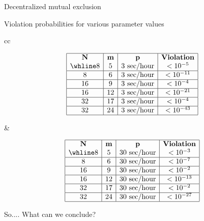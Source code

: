 \begin{slide}{Decentralized mutual exclusion}
  \begin{block}{Violation probabilities for various parameter values}
    \begin{center}
      \small\footnotesize
      \renewcommand{\arraystretch}{1.1}
      \begin{tabular}{cc}
        \begin{minipage}{0.4\textwidth}
          \[
          \begin{array}{|c|c|c|c|}\hline
            \mathbf{N}  & \mathbf{m} & \mathbf{p}        & \mbox{\textbf{Violation}} \\ \whline
            8           & 5          & \mbox{3 sec/hour} & < 10^{-5} \\ \hline
            8           & 6          & \mbox{3 sec/hour} & < 10^{-11} \\ \hline
            16          & 9          & \mbox{3 sec/hour} & < 10^{-4} \\ \hline
            16          & 12         & \mbox{3 sec/hour} & < 10^{-21} \\ \hline
            32          & 17         & \mbox{3 sec/hour} & < 10^{-4} \\ \hline
            32          & 24         & \mbox{3 sec/hour} & < 10^{-43} \\ \hline
          \end{array}
          \]
        \end{minipage} &
        \begin{minipage}{0.4\textwidth}
          \[
          \begin{array}{|c|c|c|c|}\hline
            \mathbf{N}  & \mathbf{m} & \mathbf{p}        & \mbox{\textbf{Violation}} \\ \whline
            8           & 5          & \mbox{30 sec/hour} & < 10^{-3} \\ \hline
            8           & 6          & \mbox{30 sec/hour} & < 10^{-7} \\ \hline
            16          & 9          & \mbox{30 sec/hour} & < 10^{-2} \\ \hline
            16          & 12         & \mbox{30 sec/hour} & < 10^{-13} \\ \hline
            32          & 17         & \mbox{30 sec/hour} & < 10^{-2} \\ \hline
            32          & 24         & \mbox{30 sec/hour} & < 10^{-27} \\ \hline
          \end{array}
          \]
        \end{minipage} 
      \end{tabular}
    \end{center}
  \end{block}
  \onslide
  \begin{alertblock}{So....}
    What can we conclude?
  \end{alertblock}
\end{slide}
